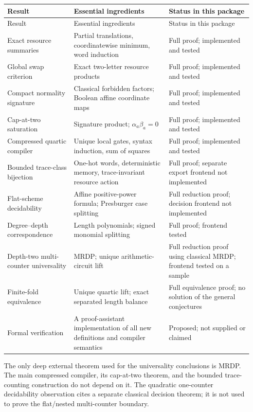 \documentclass[11pt,a4paper]{article}
\theoremstyle{definition}
\theoremstyle{remark}
\begin{document}
\begin{longtable}{@{}>{\raggedright\arraybackslash}p{}>{\raggedright\arraybackslash}p{}>{\raggedright\arraybackslash}p{}@{}}
\toprule
Result & Essential ingredients & Status in this package\\
\midrule
\endfirsthead
\toprule
Result & Essential ingredients & Status in this package\\
\midrule
\endhead
Exact resource summaries & Partial translations, coordinatewise minimum,
word induction & Full proof; implemented and tested\\[3pt]
Global swap criterion & Exact two-letter resource products & Full proof;
implemented and tested\\[3pt]
Compact normality signature & Classical forbidden factors; Boolean affine
coordinate maps & Full proof; implemented and tested\\[3pt]
Cap-at-two saturation & Signature product; $\alpha_a\beta_a=0$ & Full proof;
implemented and tested\\[3pt]
Compressed quartic compiler & Unique local gates, syntax induction,
sum of squares & Full proof; implemented and tested\\[3pt]
Bounded trace-class bijection & One-hot words, deterministic memory,
trace-invariant resource action & Full proof; separate export frontend
not implemented\\[3pt]
Flat-scheme decidability & Affine positive-power formula; Presburger
case splitting & Full reduction proof; decision frontend not implemented\\[3pt]
Degree--depth correspondence & Length polynomials; signed monomial splitting
& Full proof; frontend tested\\[3pt]
Depth-two multi-counter universality & MRDP; unique arithmetic-circuit lift
& Full reduction proof using classical MRDP; frontend tested on a sample\\[3pt]
Finite-fold equivalence & Unique quartic lift; exact separated length balance
& Full equivalence proof; no solution of the general conjectures\\[3pt]
Formal verification & A proof-assistant implementation of all new definitions
and compiler semantics & Proposed; not supplied or claimed\\
\bottomrule
\end{longtable}

The only deep external theorem used for the universality conclusions is MRDP.
The main compressed compiler, its cap-at-two theorem, and the bounded
trace-counting construction do not depend on it. The quadratic one-counter
decidability observation cites a separate classical decision theorem; it is
not used to prove the flat/nested multi-counter boundary.
\end{document}
